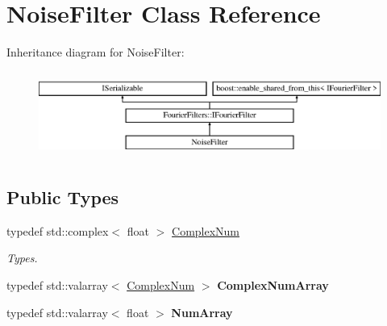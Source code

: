 \hypertarget{class_noise_filter}{}\section{Noise\+Filter Class Reference}
\label{class_noise_filter}
Inheritance diagram for Noise\+Filter\+:\begin{figure}[H]
\begin{center}
\leavevmode
\includegraphics[height=2.837838cm]{class_noise_filter}
\end{center}
\end{figure}
\subsection*{Public Types}
\begin{DoxyCompactItemize}
\item 
\mbox{\label{class_noise_filter_a370d856bcaa70d1b96e50420f8e244fa}} 
typedef std\+::complex$<$ float $>$ \hyperlink{class_noise_filter_a370d856bcaa70d1b96e50420f8e244fa}{Complex\+Num}
\begin{DoxyCompactList}\small\item\em Types. \end{DoxyCompactList}\item 
\mbox{\label{class_noise_filter_a93f473b0f202c6a0a975eef0bd034e24}} 
typedef std\+::valarray$<$ \hyperlink{class_noise_filter_a370d856bcaa70d1b96e50420f8e244fa}{Complex\+Num} $>$ {\bfseries Complex\+Num\+Array}
\item 
\mbox{\label{class_noise_filter_ad724425f427810ba3285a3b5ccc5060f}} 
typedef std\+::valarray$<$ float $>$ {\bfseries Num\+Array}
\end{DoxyCompactItemize}

